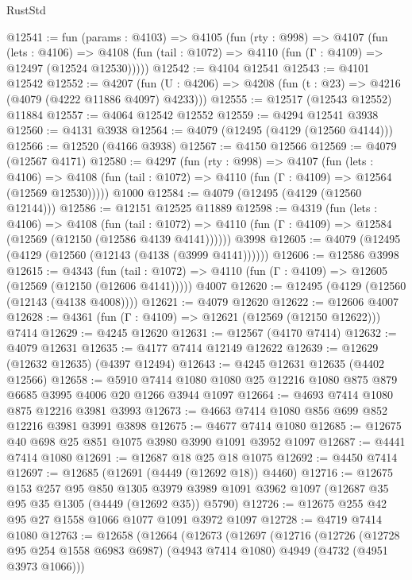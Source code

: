 \begin{lexlean}{RustStd}
\begin{coremodule}
@12541 := fun (params : @4103) =>
  @4105
    (fun (rty : @998) =>
    @4107
      (fun (lets : @4106) =>
      @4108 (fun (tail : @1072) => @4110 (fun (Γ : @4109) => @12497 (@12524 @12530)))))
@12542 := @4104 @12541
@12543 := @4101 @12542
@12552 := @4207
    (fun (U : @4206) => @4208 (fun (t : @23) => @4216 (@4079 (@4222 @11886 @4097) @4233)))
@12555 := @12517 (@12543 @12552) @11884
@12557 := @4064 @12542 @12552
@12559 := @4294 @12541 @3938
@12560 := @4131 @3938
@12564 := @4079 (@12495 (@4129 (@12560 @4144)))
@12566 := @12520 (@4166 @3938)
@12567 := @4150 @12566
@12569 := @4079 (@12567 @4171)
@12580 := @4297
    (fun (rty : @998) =>
    @4107
      (fun (lets : @4106) =>
      @4108 (fun (tail : @1072) => @4110 (fun (Γ : @4109) => @12564 (@12569 @12530)))))
    @1000
@12584 := @4079 (@12495 (@4129 (@12560 @12144)))
@12586 := @12151 @12525 @11889
@12598 := @4319
    (fun (lets : @4106) =>
    @4108
      (fun (tail : @1072) =>
      @4110 (fun (Γ : @4109) => @12584 (@12569 (@12150 (@12586 @4139 @4141))))))
    @3998
@12605 := @4079 (@12495 (@4129 (@12560 (@12143 (@4138 (@3999 @4141))))))
@12606 := @12586 @3998
@12615 := @4343
    (fun (tail : @1072) => @4110 (fun (Γ : @4109) => @12605 (@12569 (@12150 (@12606 @4141)))))
    @4007
@12620 := @12495 (@4129 (@12560 (@12143 (@4138 @4008))))
@12621 := @4079 @12620
@12622 := @12606 @4007
@12628 := @4361 (fun (Γ : @4109) => @12621 (@12569 (@12150 @12622))) @7414
@12629 := @4245 @12620
@12631 := @12567 (@4170 @7414)
@12632 := @4079 @12631
@12635 := @4177 @7414 @12149 @12622
@12639 := @12629 (@12632 @12635) (@4397 @12494)
@12643 := @4245 @12631 @12635 (@4402 @12566)
@12658 := @5910 @7414 @1080 @1080 @25 @12216 @1080 @875 @879 @6685 @3995 @4006 @20 @1266 @3944 @1097
@12664 := @4693 @7414 @1080 @875 @12216 @3981 @3993
@12673 := @4663 @7414 @1080 @856 @699 @852 @12216 @3981 @3991 @3898
@12675 := @4677 @7414 @1080
@12685 := @12675 @40 @698 @25 @851 @1075 @3980 @3990 @1091 @3952 @1097
@12687 := @4441 @7414 @1080
@12691 := @12687 @18 @25 @18 @1075
@12692 := @4450 @7414
@12697 := @12685 (@12691 (@4449 (@12692 @18)) @4460)
@12716 := @12675
    @153
    @257
    @95
    @850
    @1305
    @3979
    @3989
    @1091
    @3962
    @1097
    (@12687 @35 @95 @35 @1305 (@4449 (@12692 @35)) @5790)
@12726 := @12675 @255 @42 @95 @27 @1558 @1066 @1077 @1091 @3972 @1097
@12728 := @4719 @7414 @1080
@12763 := @12658
    (@12664
      (@12673
        (@12697
          (@12716
            (@12726
              (@12728 @95 @254 @1558 @6983 @6987)
              (@4943 @7414 @1080)
              @4949
              (@4732 (@4951 @3973 @1066)))

\end{coremodule}
\end{lexlean}

